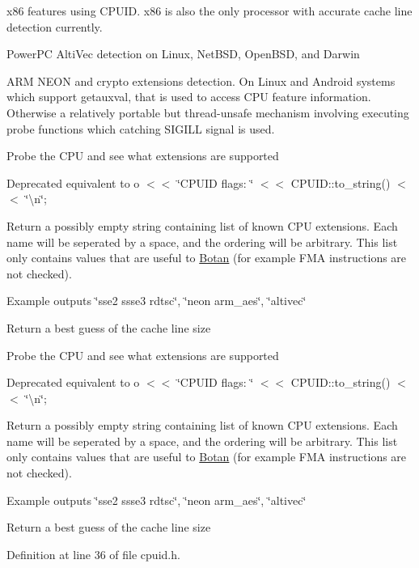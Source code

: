 \begin{DoxyItemize}
\item x86 features using C\+P\+U\+ID. x86 is also the only processor with accurate cache line detection currently.
\item Power\+PC Alti\+Vec detection on Linux, Net\+B\+SD, Open\+B\+SD, and Darwin
\item A\+RM N\+E\+ON and crypto extensions detection. On Linux and Android systems which support getauxval, that is used to access C\+PU feature information. Otherwise a relatively portable but thread-\/unsafe mechanism involving executing probe functions which catching S\+I\+G\+I\+LL signal is used. 
\end{DoxyItemize}Probe the C\+PU and see what extensions are supported

Deprecated equivalent to o $<$$<$ \char`\"{}\+C\+P\+U\+I\+D flags\+: \char`\"{} $<$$<$ C\+P\+U\+I\+D\+::to\+\_\+string() $<$$<$ \char`\"{}\textbackslash{}n\char`\"{};

Return a possibly empty string containing list of known C\+PU extensions. Each name will be seperated by a space, and the ordering will be arbitrary. This list only contains values that are useful to \mbox{\hyperlink{namespace_botan}{Botan}} (for example F\+MA instructions are not checked).

Example outputs \char`\"{}sse2 ssse3 rdtsc\char`\"{}, \char`\"{}neon arm\+\_\+aes\char`\"{}, \char`\"{}altivec\char`\"{}

Return a best guess of the cache line size

Probe the C\+PU and see what extensions are supported

Deprecated equivalent to o $<$$<$ \char`\"{}\+C\+P\+U\+I\+D flags\+: \char`\"{} $<$$<$ C\+P\+U\+I\+D\+::to\+\_\+string() $<$$<$ \char`\"{}\textbackslash{}n\char`\"{};

Return a possibly empty string containing list of known C\+PU extensions. Each name will be seperated by a space, and the ordering will be arbitrary. This list only contains values that are useful to \mbox{\hyperlink{namespace_botan}{Botan}} (for example F\+MA instructions are not checked).

Example outputs \char`\"{}sse2 ssse3 rdtsc\char`\"{}, \char`\"{}neon arm\+\_\+aes\char`\"{}, \char`\"{}altivec\char`\"{}

Return a best guess of the cache line size

Definition at line 36 of file cpuid.\+h.

\mbox{\label{namespace_botan_a306d82593a051b515b926e213e8040f2}} 
